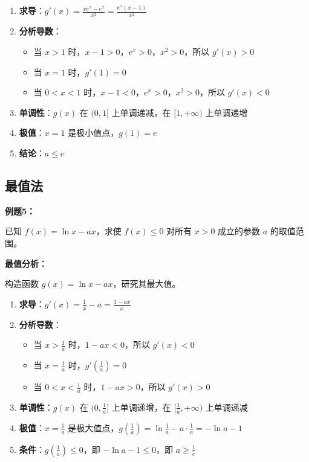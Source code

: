 \documentclass[a4paper,11pt]{ctexrep}
\newcommand{\exampleicon}{\ModeBadge[highlight]{例题}}
\newcommand{\analysisicon}{\ModeBadge[secondary]{分析}}
\theoremstyle{definition}
\begin{document}
\begin{enumerate}
    \item \textbf{求导}：$g'(x) = \frac{xe^x - e^x}{x^2} = \frac{e^x(x-1)}{x^2}$
    \item \textbf{分析导数}：
    \begin{itemize}
        \item 当 $x > 1$ 时，$x-1 > 0$，$e^x > 0$，$x^2 > 0$，所以 $g'(x) > 0$
        \item 当 $x = 1$ 时，$g'(1) = 0$
        \item 当 $0 < x < 1$ 时，$x-1 < 0$，$e^x > 0$，$x^2 > 0$，所以 $g'(x) < 0$
    \end{itemize}
    \item \textbf{单调性}：$g(x)$ 在 $(0, 1]$ 上单调递减，在 $[1, +\infty)$ 上单调递增
    \item \textbf{极值}：$x = 1$ 是极小值点，$g(1) = e$
    \item \textbf{结论}：$a \leq e$
\end{enumerate}

\subsection{最值法}

\exampleicon \textbf{例题5：}

已知 $f(x) = \ln x - ax$，求使 $f(x) \leq 0$ 对所有 $x > 0$ 成立的参数 $a$ 的取值范围。

\analysisicon \textbf{最值分析：}

构造函数 $g(x) = \ln x - ax$，研究其最大值。

\begin{enumerate}
    \item \textbf{求导}：$g'(x) = \frac{1}{x} - a = \frac{1-ax}{x}$
    \item \textbf{分析导数}：
    \begin{itemize}
        \item 当 $x > \frac{1}{a}$ 时，$1-ax < 0$，所以 $g'(x) < 0$
        \item 当 $x = \frac{1}{a}$ 时，$g'(\frac{1}{a}) = 0$
        \item 当 $0 < x < \frac{1}{a}$ 时，$1-ax > 0$，所以 $g'(x) > 0$
    \end{itemize}
    \item \textbf{单调性}：$g(x)$ 在 $(0, \frac{1}{a}]$ 上单调递增，在 $[\frac{1}{a}, +\infty)$ 上单调递减
    \item \textbf{极值}：$x = \frac{1}{a}$ 是极大值点，$g(\frac{1}{a}) = \ln \frac{1}{a} - a \cdot \frac{1}{a} = -\ln a - 1$
    \item \textbf{条件}：$g(\frac{1}{a}) \leq 0$，即 $-\ln a - 1 \leq 0$，即 $a \geq \frac{1}{e}$
\end{enumerate}
\end{document}

